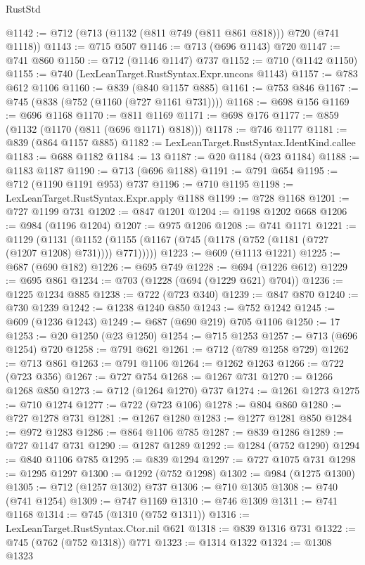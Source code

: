 \begin{lexlean}{RustStd}
\begin{coremodule}
@1142 := @712 (@713 (@1132 (@811 @749 (@811 @861 @818))) @720 (@741 @1118))
@1143 := @715 @507
@1146 := @713 (@696 @1143) @720
@1147 := @741 @860
@1150 := @712 (@1146 @1147) @737
@1152 := @710 (@1142 @1150)
@1155 := @740 (LexLeanTarget.RustSyntax.Expr.uncons @1143)
@1157 := @783 @612 @1106
@1160 := @839 (@840 @1157 @885)
@1161 := @753 @846
@1167 := @745 (@838 (@752 (@1160 (@727 @1161 @731))))
@1168 := @698 @156
@1169 := @696 @1168
@1170 := @811 @1169
@1171 := @698 @176
@1177 := @859 (@1132 (@1170 (@811 (@696 @1171) @818)))
@1178 := @746 @1177
@1181 := @839 (@864 @1157 @885)
@1182 := LexLeanTarget.RustSyntax.IdentKind.callee
@1183 := @688 @1182
@1184 := 13
@1187 := @20 @1184 (@23 @1184)
@1188 := @1183 @1187
@1190 := @713 (@696 @1188)
@1191 := @791 @654
@1195 := @712 (@1190 @1191 @953) @737
@1196 := @710 @1195
@1198 := LexLeanTarget.RustSyntax.Expr.apply @1188
@1199 := @728 @1168
@1201 := @727 @1199 @731
@1202 := @847 @1201
@1204 := @1198 @1202 @668
@1206 := @984 (@1196 @1204)
@1207 := @975 @1206
@1208 := @741 @1171
@1221 := @1129
    (@1131 (@1152 (@1155 (@1167 (@745 (@1178 (@752 (@1181 (@727 (@1207 @1208) @731)))) @771)))))
@1223 := @609 (@1113 @1221)
@1225 := @687 (@690 @182)
@1226 := @695 @749
@1228 := @694 (@1226 @612)
@1229 := @695 @861
@1234 := @703 (@1228 (@694 (@1229 @621) @704))
@1236 := @1225 @1234 @885
@1238 := @722 (@723 @340)
@1239 := @847 @870
@1240 := @730 @1239
@1242 := @1238 @1240 @850
@1243 := @752 @1242
@1245 := @609 (@1236 @1243)
@1249 := @687 (@690 @219) @705 @1106
@1250 := 17
@1253 := @20 @1250 (@23 @1250)
@1254 := @715 @1253
@1257 := @713 (@696 @1254) @720
@1258 := @791 @621
@1261 := @712 (@789 @1258 @729)
@1262 := @713 @861
@1263 := @791 @1106
@1264 := @1262 @1263
@1266 := @722 (@723 @356)
@1267 := @727 @754
@1268 := @1267 @731
@1270 := @1266 @1268 @850
@1273 := @712 (@1264 @1270) @737
@1274 := @1261 @1273
@1275 := @710 @1274
@1277 := @722 (@723 @106)
@1278 := @804 @860
@1280 := @727 @1278 @731
@1281 := @1267 @1280
@1283 := @1277 @1281 @850
@1284 := @972 @1283
@1286 := @864 @1106 @785
@1287 := @839 @1286
@1289 := @727 @1147 @731
@1290 := @1287 @1289
@1292 := @1284 (@752 @1290)
@1294 := @840 @1106 @785
@1295 := @839 @1294
@1297 := @727 @1075 @731
@1298 := @1295 @1297
@1300 := @1292 (@752 @1298)
@1302 := @984 (@1275 @1300)
@1305 := @712 (@1257 @1302) @737
@1306 := @710 @1305
@1308 := @740 (@741 @1254)
@1309 := @747 @1169
@1310 := @746 @1309
@1311 := @741 @1168
@1314 := @745 (@1310 (@752 @1311))
@1316 := LexLeanTarget.RustSyntax.Ctor.nil @621
@1318 := @839 @1316 @731
@1322 := @745 (@762 (@752 @1318)) @771
@1323 := @1314 @1322
@1324 := @1308 @1323

\end{coremodule}
\end{lexlean}
